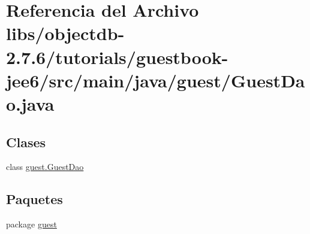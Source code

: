 \hypertarget{guestbook-jee6_2src_2main_2java_2guest_2_guest_dao_8java}{}\section{Referencia del Archivo libs/objectdb-\/2.7.6/tutorials/guestbook-\/jee6/src/main/java/guest/\+Guest\+Dao.java}
\label{guestbook-jee6_2src_2main_2java_2guest_2_guest_dao_8java}
\subsection*{Clases}
\begin{DoxyCompactItemize}
\item 
class \mbox{\hyperlink{classguest_1_1_guest_dao}{guest.\+Guest\+Dao}}
\end{DoxyCompactItemize}
\subsection*{Paquetes}
\begin{DoxyCompactItemize}
\item 
package \mbox{\hyperlink{namespaceguest}{guest}}
\end{DoxyCompactItemize}
